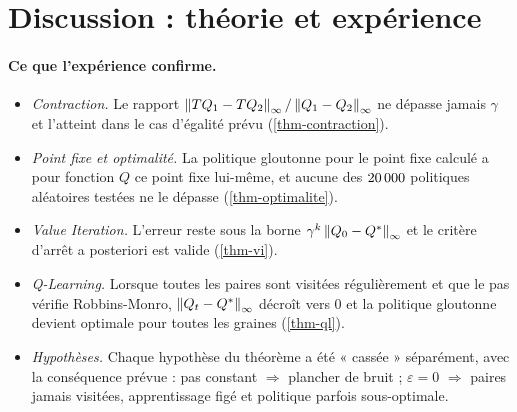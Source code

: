 \section{Discussion : théorie et expérience}\label{sec-discussion}

\paragraph{Ce que l'expérience confirme.}
\begin{itemize}
\item \emph{Contraction.} Le rapport $\left\lVert TQ_1-TQ_2 \right\rVert_\infty/\left\lVert Q_1-Q_2 \right\rVert_\infty$ ne dépasse jamais $\gamma$ et l'atteint dans le cas d'égalité prévu (\cref{thm-contraction}).
\item \emph{Point fixe et optimalité.} La politique gloutonne pour le point fixe calculé a pour fonction $Q$ ce point fixe lui-même, et aucune des $20\,000$ politiques aléatoires testées ne le dépasse (\cref{thm-optimalite}).
\item \emph{Value Iteration.} L'erreur reste sous la borne $\gamma^k\left\lVert Q_0-Q^* \right\rVert_\infty$ et le critère d'arrêt a posteriori est valide (\cref{thm-vi}).
\item \emph{Q-Learning.} Lorsque toutes les paires sont visitées régulièrement et que le pas vérifie Robbins-Monro, $\left\lVert Q_t-Q^* \right\rVert_\infty$ décroît vers $0$ et la politique gloutonne devient optimale pour toutes les graines (\cref{thm-ql}).
\item \emph{Hypothèses.} Chaque hypothèse du théorème a été « cassée » séparément, avec la conséquence prévue : pas constant $\Rightarrow$ plancher de bruit ; $\varepsilon=0$ $\Rightarrow$ paires jamais visitées, apprentissage figé et politique parfois sous-optimale.
\end{itemize}

